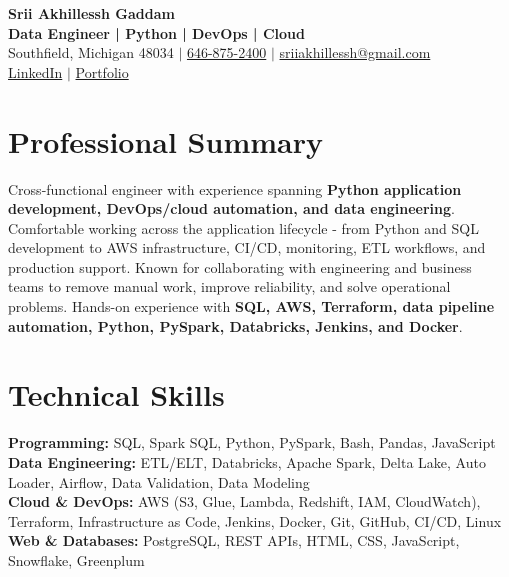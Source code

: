 \documentclass[letterpaper,10pt]{article}
\begin{document}
\fontsize{9.35pt}{10.45pt}\selectfont

\begin{center}
    {\LARGE \textbf{Srii Akhillessh Gaddam}} \\[-1pt]
    \textbf{Data Engineer | Python | DevOps | Cloud} \\[2pt]
    Southfield, Michigan 48034 $|$
    \href{tel:6468752400}{646-875-2400} $|$
    \href{mailto:sriiakhillessh@gmail.com}{sriiakhillessh@gmail.com} \\[1pt]
    \href{https://www.linkedin.com/in/srii-akhiilessh-gaddam-b48668191/}{LinkedIn} $|$
    \href{https://sriiakhillesshg.github.io/portfolio/}{Portfolio}
\end{center}
\vspace{-8pt}

\section{Professional Summary}
\small{Cross-functional engineer with experience spanning \textbf{Python application development, DevOps/cloud automation, and data engineering}. Comfortable working across the application lifecycle - from Python and SQL development to AWS infrastructure, CI/CD, monitoring, ETL workflows, and production support. Known for collaborating with engineering and business teams to remove manual work, improve reliability, and solve operational problems. Hands-on experience with \textbf{SQL, AWS, Terraform, data pipeline automation, Python, PySpark, Databricks, Jenkins, and Docker}.}

\section{Technical Skills}
\small{
\textbf{Programming:} SQL, Spark SQL, Python, PySpark, Bash, Pandas, JavaScript \\
\textbf{Data Engineering:} ETL/ELT, Databricks, Apache Spark, Delta Lake, Auto Loader, Airflow, Data Validation, Data Modeling \\
\textbf{Cloud \& DevOps:} AWS (S3, Glue, Lambda, Redshift, IAM, CloudWatch), Terraform, Infrastructure as Code, Jenkins, Docker, Git, GitHub, CI/CD, Linux \\
\textbf{Web \& Databases:} PostgreSQL, REST APIs, HTML, CSS, JavaScript, Snowflake, Greenplum
}
\end{document}
